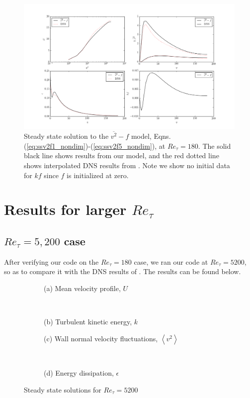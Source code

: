 \documentclass[a4paper,11pt]{article}
\newcommand{\chevron}[1]{\left\langle #1 \right\rangle}
\newcommand{\ep}{\epsilon}
\begin{document}
\begin{figure}
 \centering
 \includegraphics[width=\textwidth]{results_180}
 \caption{Steady state solution to the $\overline{v^2}-f$ model, Eqns.
(\ref{eq:ssv2f1_nondim})-(\ref{eq:ssv2f5_nondim}), at $Re_\tau=180$. The solid
black line shows results from our model, and the red dotted line shows
interpolated DNS results from \cite{Lee}. Note we show no initial data for $kf$
since $f$ is initialized at zero.}
 \label{fig:results_180}
\end{figure}


\section{Results for larger $Re_\tau$}
\subsection{$Re_\tau = 5,200$ case}
After verifying our code on the $Re_{\tau} = 180$ case, we ran our code at $Re_{\tau} = 5200$, so as to compare it with the DNS results of \cite{Lee}. The results can be found below. 

\begin{figure}
	\centering
	\begin{subfigure}[b] %
		\texttt{[image: ]}
		\caption{(a) Mean velocity profile, $U$}
		\label{fig: results_U_5200}
	\end{subfigure}
	~
	\begin{subfigure}[b] %
		\texttt{[image: ]}
		\caption{(b) Turbulent kinetic energy, $k$}
		\label{fig: results_k_5200}
	\end{subfigure}
	
	\begin{subfigure}[b] %
		\texttt{[image: ]}
		\caption{(c) Wall normal velocity fluctuations, $\chevron{v^2}$}
		\label{fig: results_v2_5200}
	\end{subfigure}
	~	
	\begin{subfigure}[b] %
		\texttt{[image: ]}
		\caption{(d) Energy dissipation, $\ep$}
		\label{fig: results_eps_5200}
	\end{subfigure}	
	\caption{Steady state solutions for $Re_\tau = 5200$}
\end{figure}
\end{document}
